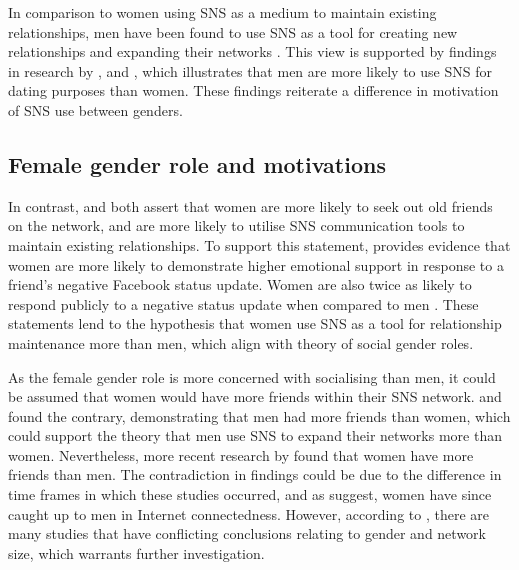 In comparison to women using SNS as a medium to maintain existing relationships, men have been found to use SNS as a tool for creating new relationships and expanding their networks \citep{Mazman2011}. This view is supported by findings in research by \citet{Muscanell2012}, \citet{Raacke2008} and \citet{Haferkamp2012}, which illustrates that men are more likely to use SNS for dating purposes than women. These findings reiterate a difference in motivation of SNS use between genders. 

\subsection{Female gender role and motivations}

In contrast, \citet{Mazman2011} and \citet{Muscanell2012} both assert that women are more likely to seek out old friends on the network, and are more likely to utilise SNS communication tools to maintain existing relationships. To support this statement, \citet{Joiner2014} provides evidence that women are more likely to demonstrate higher emotional support in response to a friend's negative Facebook status update. Women are also twice as likely to respond publicly to a negative status update when compared to men \citep[p. 167]{Joiner2014}. These statements lend to the hypothesis that women use SNS as a tool for relationship maintenance more than men, which align with  theory of social gender roles.

As the female gender role is more concerned with socialising than men, it could be assumed that women would have more friends within their SNS network. \citet{Raacke2008} and \citet{Fogel2009} found the contrary, demonstrating that men had more friends than women, which could support the theory that men use SNS to expand their networks more than women. Nevertheless, more recent research by \citet{McAndrew2012} found that women have more friends than men. The contradiction in findings could be due to the difference in time frames in which these studies occurred, and as \citet{Fallows2005} suggest, women have since caught up to men in Internet connectedness. However, according to \citet[p. 389]{Tifferet2014}, there are many studies that have conflicting conclusions relating to gender and network size, which warrants further investigation.